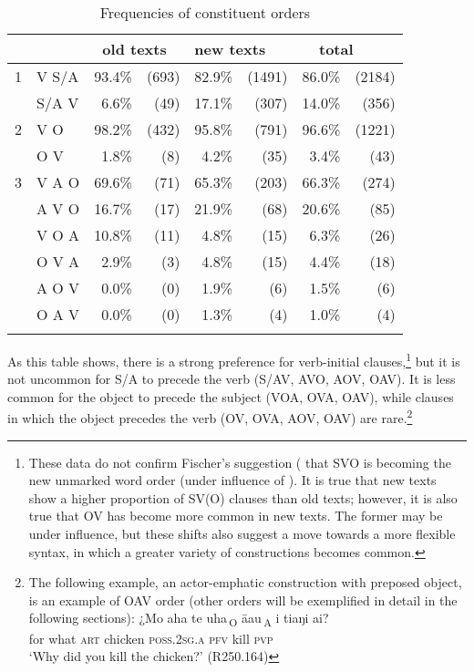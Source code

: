 \begin{table}[p]
\begin{tabularx}{\textwidth}{Xlrr@{\hspace*{1.5cm}} rr@{\hspace*{1.5cm}} rr}
\lsptoprule
&  & \multicolumn{2}{l}{ {~old texts}} & \multicolumn{2}{l}{ { new texts}} & \multicolumn{2}{l}{ {~~total}} \\
\midrule
{ 1} & { V S/A} &  93.4\%&  (693)&  82.9\%&  (1491)&  86.0\%&  (2184)\\
& { S/A V} &  6.6\%&  (49)&  17.1\%&  (307)&  14.0\%&  (356)\\
\tablevspace
{ 2} & { V O} &  98.2\%&  (432)&  95.8\%&  (791)&  96.6\%&  (1221)\\
& { O V} &  1.8\%&  (8)&  4.2\%&  (35)&  3.4\%&  (43)\\
\tablevspace
{ 3} & { V A O} &  69.6\%&  (71)&  65.3\%&  (203)&  66.3\%&  (274)\\
& { A V O} &  16.7\%&  (17)&  21.9\%&  (68)&  20.6\%&  (85)\\
& { V O A} &  10.8\%&  (11)&  4.8\%&  (15)&  6.3\%&  (26)\\
& { O V A} &  2.9\%&  (3)&  4.8\%&  (15)&  4.4\%&  (18)\\
& { A O V} &  0.0\%&  (0)&  1.9\%&  (6)&  1.5\%&  (6)\\
& { O A V} &  0.0\%&  (0)&  1.3\%&  (4)&  1.0\%&  (4)\\
\lspbottomrule
\end{tabularx}
\caption{Frequencies of constituent orders}
\label{tab:56}
\end{table}

As this table shows, there is a strong preference for verb-initial clauses,\footnote{\label{fn:381}These data do not confirm Fischer’s suggestion (\citealt[323]{Fischer2001Hispan} that SVO is becoming the new unmarked word order (under influence of ). It is true that new texts show a higher proportion of SV(O) clauses than old texts; however, it is also true that OV has become more common in new texts. The former may be under  influence, but these shifts also suggest a move towards a more flexible syntax, in which a greater variety of constructions becomes common.} but it is not uncommon for S/A to precede the verb (S/AV, AVO, AOV, OAV). It is less common for the object to precede the subject (VOA, OVA, OAV), while clauses in which the object precedes the verb (OV, OVA, AOV, OAV) are rare.\footnote{\label{fn:382}The following example, an actor-emphatic construction with preposed object, is an example of OAV order (other orders will be exemplified in detail in the following sections):
\ea
\gll ¿Mo aha {\ob}te {\ꞌ}uha\,{\cb}\textsubscript{\textup{O}} {\ob}{\ꞌ}ā{\ꞌ}au\,{\cb}\textsubscript{\textup{A}} i tiaŋi ai?\\
   for what {\db}\textsc{art} chicken {\db}\textsc{poss.2sg.a} \textsc{pfv} kill \textsc{pvp}\\
   \glt 
  ‘Why did you kill the chicken?’ (R250.164)\z 
  } 

